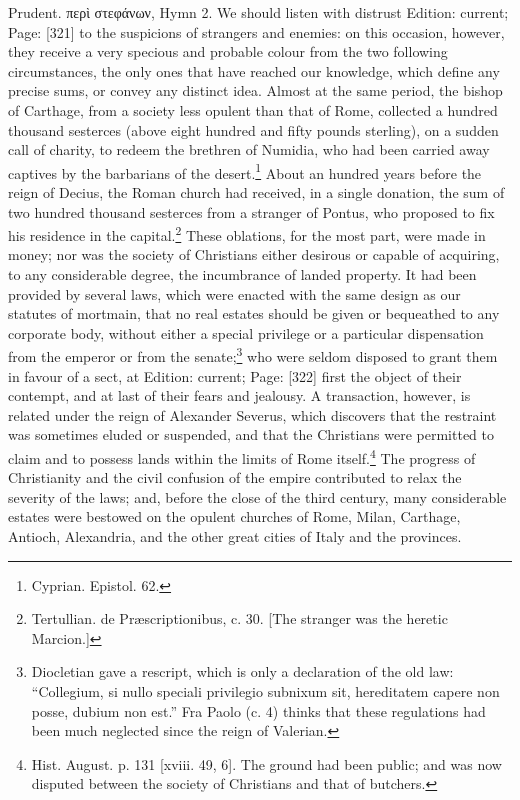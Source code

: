 {Prudent. \textgreek{περ\texthebrew{ὶ} στεφάνων}, Hymn 2.} We should listen with distrust Edition: current; Page: [321] to the suspicions of strangers and enemies: on this occasion, however, they receive a very specious and probable colour from the two following circumstances, the only ones that have reached our knowledge, which define any precise sums, or convey any distinct idea. Almost at the same period, the bishop of Carthage, from a society less opulent than that of Rome, collected a hundred thousand sesterces (above eight hundred and fifty pounds sterling), on a sudden call of charity, to redeem the brethren of Numidia, who had been carried away captives by the barbarians of the desert.\footnote{Cyprian. Epistol. 62.} About an hundred years before the reign of Decius, the Roman church had received, in a single donation, the sum of two hundred thousand sesterces from a stranger of Pontus, who proposed to fix his residence in the capital.\footnote{Tertullian. de Præscriptionibus, c. 30. [The stranger was the heretic Marcion.]} These oblations, for the most part, were made in money; nor was the society of Christians either desirous or capable of acquiring, to any considerable degree, the incumbrance of landed property. It had been provided by several laws, which were enacted with the same design as our statutes of mortmain, that no real estates should be given or bequeathed to any corporate body, without either a special privilege or a particular dispensation from the emperor or from the senate;\footnote{Diocletian gave a rescript, which is only a declaration of the old law: \texthebrew{“}Collegium, si nullo speciali privilegio subnixum sit, hereditatem capere non posse, dubium non est.\texthebrew{}” Fra Paolo (c. 4) thinks that these regulations had been much neglected since the reign of Valerian.} who were seldom disposed to grant them in favour of a sect, at Edition: current; Page: [322] first the object of their contempt, and at last of their fears and jealousy. A transaction, however, is related under the reign of Alexander Severus, which discovers that the restraint was sometimes eluded or suspended, and that the Christians were permitted to claim and to possess lands within the limits of Rome itself.\footnote{Hist. August. p. 131 [xviii. 49, 6]. The ground had been public; and was now disputed between the society of Christians and that of butchers.} The progress of Christianity and the civil confusion of the empire contributed to relax the severity of the laws; and, before the close of the third century, many considerable estates were bestowed on the opulent churches of Rome, Milan, Carthage, Antioch, Alexandria, and the other great cities of Italy and the provinces.

